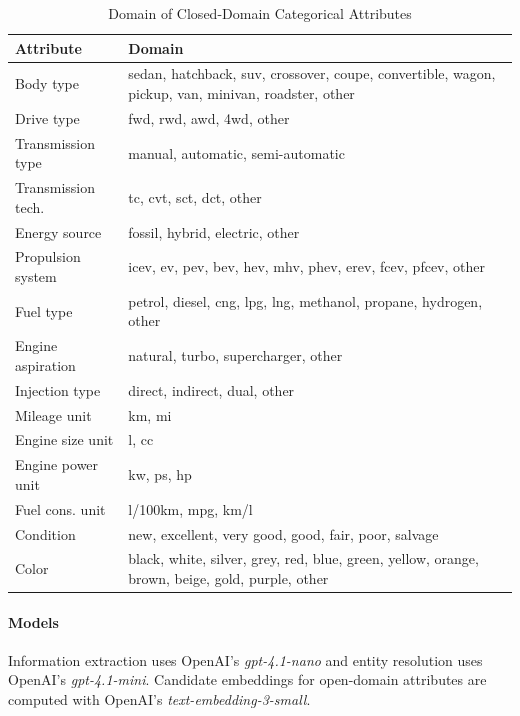 \documentclass[conference]{IEEEtran}
\begin{document}
\begin{table}[htbp]
\caption{Domain of Closed-Domain Categorical Attributes}
\begin{center}
\footnotesize
\begin{tabular}{|p{2.2cm}|p{5.4cm}|}
\hline
\textbf{Attribute} & \textbf{Domain} \\
\hline
Body type & sedan, hatchback, suv, crossover, coupe, convertible, wagon, pickup, van, minivan, roadster, other \\
\hline
Drive type & fwd, rwd, awd, 4wd, other \\
\hline
Transmission type & manual, automatic, semi-automatic \\
\hline
Transmission tech. & tc, cvt, sct, dct, other \\
\hline
Energy source & fossil, hybrid, electric, other \\
\hline
Propulsion system & icev, ev, pev, bev, hev, mhv, phev, erev, fcev, pfcev, other \\
\hline
Fuel type & petrol, diesel, cng, lpg, lng, methanol, propane, hydrogen, other \\
\hline
Engine aspiration & natural, turbo, supercharger, other \\
\hline
Injection type & direct, indirect, dual, other \\
\hline
Mileage unit & km, mi \\
\hline
Engine size unit & l, cc \\
\hline
Engine power unit & kw, ps, hp \\
\hline
Fuel cons. unit & l/100km, mpg, km/l \\
\hline
Condition & new, excellent, very good, good, fair, poor, salvage \\
\hline
Color & black, white, silver, grey, red, blue, green, yellow, orange, brown, beige, gold, purple, other \\
\hline
\end{tabular}
\label{tab:catalog}
\end{center}
\end{table}

\paragraph{Models}
Information extraction uses OpenAI's \textit{gpt-4.1-nano} and
entity resolution uses OpenAI's \textit{gpt-4.1-mini}. Candidate
embeddings for open-domain attributes are computed with
OpenAI's \textit{text-embedding-3-small}.
\end{document}
